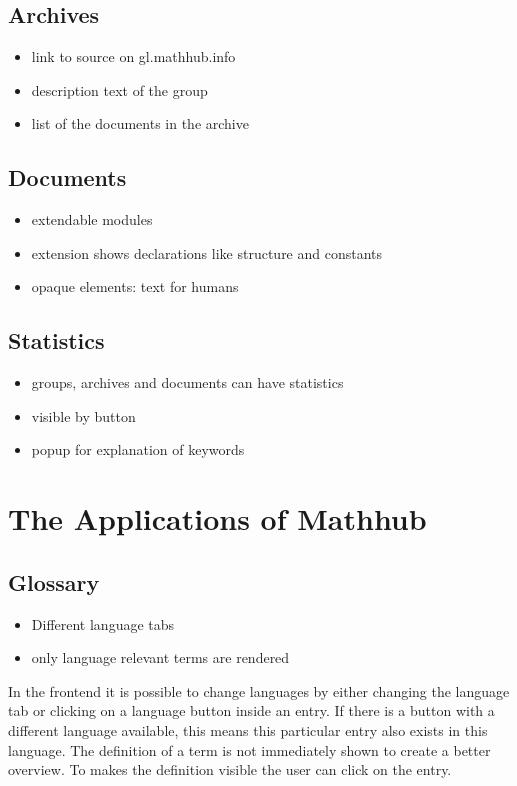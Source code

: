\documentclass[11pt,a4paper]{article}
\begin{document}
\subsection{Archives}
\begin{itemize}
\item link to source on gl.mathhub.info
\item description text of the group
\item list of the documents in the archive
\end{itemize}	 

\subsection{Documents}
\begin{itemize}
\item extendable modules
\item extension shows declarations like structure and constants
\item opaque elements: text for humans
\end{itemize}

\subsection{Statistics}
\begin{itemize}
\item groups, archives and documents can have statistics
\item visible by button
\item popup for explanation of keywords
\end{itemize}

\section{The Applications of Mathhub}
	\subsection{Glossary}
\begin{itemize}
\item Different language tabs
\item only language relevant terms are rendered
\end{itemize}
In the frontend it is possible to change languages by either changing the language tab or clicking on a language button inside an entry.
If there is a button with a different language available, this means this particular entry also exists in this language.
The definition of a term is not immediately shown to create a better overview.
To makes the definition visible the user can click on the entry.
\end{document}
